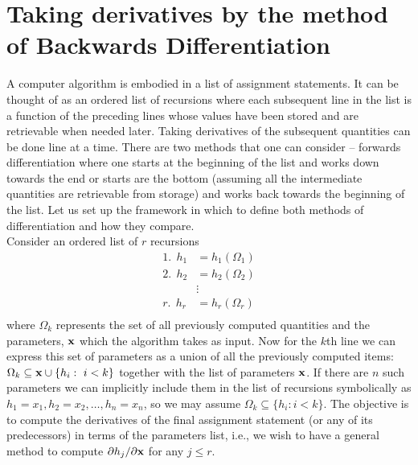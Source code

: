 \section{Taking derivatives by the method of Backwards Differentiation}
A computer algorithm is embodied in a list of assignment statements. It can be thought of as an ordered list of recursions where each subsequent line in the list is a function of the preceding lines whose values have been stored and are retrievable when needed later. Taking derivatives of the subsequent quantities can be done line at a time. There are two methods that one can consider -- forwards differentiation where one starts at the beginning of the list and works down towards the end or starts are the bottom (assuming all the intermediate quantities are retrievable from storage) and works back towards the beginning of the list. Let us set up the framework in which to define both methods of differentiation and how they compare. \\

Consider an ordered list of $r$ recursions
\begin{align*}
1.~~h_1 &= h_1(\Omega_1)\\
2.~~h_2 &= h_2(\Omega_2)\\ 
             &\vdots\\
r.~~h_r &= h_r(\Omega_r)\\
\end{align*}where $\Omega_k$ represents the set of all previously computed quantities and the parameters, $\bf x$ which the algorithm takes as input. Now for the $k$th line we can express this set
of parameters as a union of all the previously computed items: $\Omega_k \subseteq {\bf x} \cup \{ h_i: ~i<k\}$ together with the list of parameters $\bf x$. If there are $n$ such parameters we can implicitly include them in the list of recursions symbolically as $h_1 = x_1, h_2 = x_2, \hdots, h_n = x_n$, so we may assume $\Omega_k \subseteq \{h_i: i < k\}$. The objective is to compute the derivatives of the final assignment statement (or any of its predecessors) in terms of the parameters list, i.e., we wish to have a general method to compute $\partial h_j/\partial {\bf x}$ for any $j \le r$.\\

